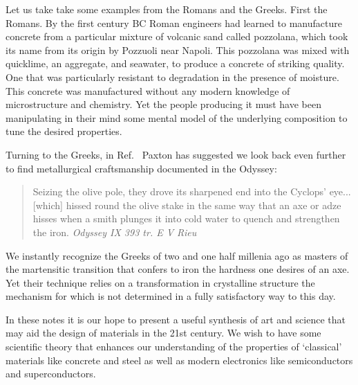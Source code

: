 Let us take take some examples from the Romans and the Greeks. 
First the Romans. By the first century BC Roman engineers had 
learned to manufacture concrete from a 
particular mixture of volcanic sand called pozzolana,
which took its name from its origin by Pozzuoli near Napoli. 
%
This pozzolana was mixed with quicklime, an aggregate, and seawater,
to produce a concrete of striking quality. One that was
particularly resistant to degradation in the presence of moisture.
This concrete was manufactured without any modern knowledge of microstructure 
and chemistry. Yet the people producing it must have been manipulating in their
mind some mental model of the underlying composition to tune the desired properties.
%
%

Turning to the Greeks, in Ref.~\cite{paxton92} Paxton has suggested we 
look back even further to find metallurgical craftsmanship documented in the Odyssey:
%
\begin{quote}
        Seizing the olive pole, they drove its sharpened end into the Cyclops' eye...
        [which] hissed round the olive stake in the same way that an axe or adze hisses
        when a smith plunges it into cold water to quench and strengthen the iron.
        \textit{Odyssey IX 393 tr. E V Rieu}
\end{quote}
%
We instantly recognize the Greeks of two and one half millenia ago 
as masters of the martensitic transition that confers
to iron the hardness one desires of an axe. Yet their technique relies on a
transformation in crystalline structure the mechanism for which is not determined
in a fully satisfactory way to this day.


In these notes it is our hope to present a useful synthesis of art and science that may aid the 
design of materials in the 21st century. We wish to have some scientific theory that enhances our
understanding of the properties of `classical' materials like concrete and steel 
as well as modern electronics like semiconductors and superconductors.

